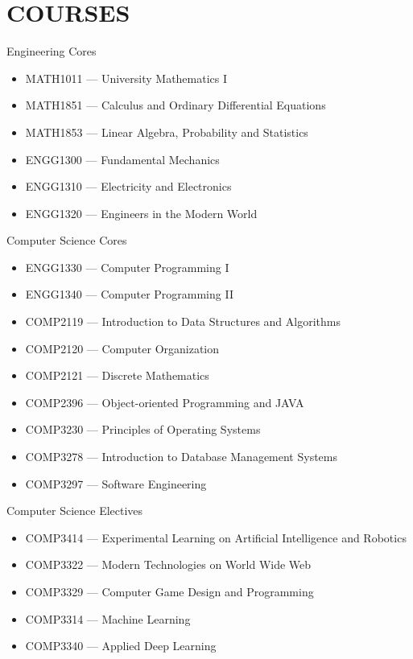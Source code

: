 \documentclass{article}
\begin{document}
\section{COURSES}
\vspace{0.3cm}

Engineering Cores
\begin{itemize}
    \item[] MATH1011 --- University Mathematics I
    \item[] MATH1851 --- Calculus and Ordinary Differential Equations
    \item[] MATH1853 --- Linear Algebra, Probability and Statistics
    \item[] ENGG1300 --- Fundamental Mechanics
    \item[] ENGG1310 --- Electricity and Electronics
    \item[] ENGG1320 --- Engineers in the Modern World
\end{itemize}

Computer Science Cores
\begin{itemize}
    \item[] ENGG1330 --- Computer Programming I
    \item[] ENGG1340 --- Computer Programming II
    \item[] COMP2119 --- Introduction to Data Structures and Algorithms
    \item[] COMP2120 --- Computer Organization
    \item[] COMP2121 --- Discrete Mathematics
    \item[] COMP2396 --- Object-oriented Programming and JAVA
    \item[] COMP3230 --- Principles of Operating Systems
    \item[] COMP3278 --- Introduction to Database Management Systems
    \item[] COMP3297 --- Software Engineering
\end{itemize}

Computer Science Electives
\begin{itemize}
    \item[] COMP3414 --- Experimental Learning on Artificial Intelligence and Robotics
    \item[] COMP3322 --- Modern Technologies on World Wide Web
    \item[] COMP3329 --- Computer Game Design and Programming
    \item[] COMP3314 --- Machine Learning
    \item[] COMP3340 --- Applied Deep Learning
\end{itemize}
\end{document}
